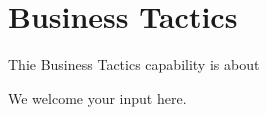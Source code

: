 \section{Business Tactics}%
\label{sec:ekg-mm-a-1-3}
\label{sec:ekg-mm-business-tactics}


Thie Business Tactics capability is about


\ekgmmContextSection

We welcome your input here.

